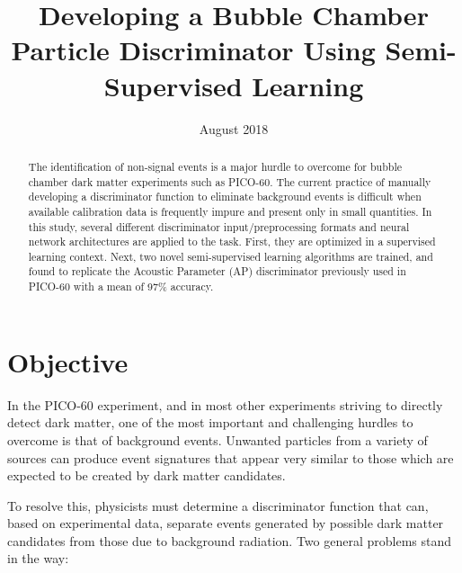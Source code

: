 \documentclass[10pt]{article}
\begin{document}
\title{Developing a Bubble Chamber Particle Discriminator Using Semi-Supervised Learning}

\date{August 2018}
\maketitle

\begin{abstract}
    The identification of non-signal events is a major hurdle to overcome for bubble chamber dark matter experiments such as PICO-60. The current practice of manually developing a discriminator function to eliminate background events is difficult when available calibration data is frequently impure and present only in small quantities. In this study, several different discriminator input/preprocessing formats and neural network architectures are applied to the task. First, they are optimized in a supervised learning context. Next, two novel semi-supervised learning algorithms are trained, and found to replicate the Acoustic Parameter (AP) discriminator previously used in PICO-60 with a mean of 97\% accuracy.
\end{abstract}

\section{Objective}

In the PICO-60 experiment, and in most other experiments striving to directly detect dark matter, one of the most important and challenging hurdles to overcome is that of background events. Unwanted particles from a variety of sources can produce event signatures that appear very similar to those which are expected to be created by dark matter candidates.

To resolve this, physicists must determine a discriminator function that can, based on experimental data, separate events generated by possible dark matter candidates from those due to background radiation. Two general problems stand in the way:
\end{document}
